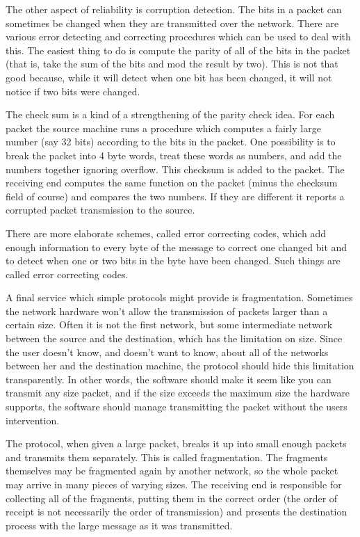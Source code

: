 The other aspect of reliability is corruption detection.  The bits in a
packet can sometimes be changed when they are transmitted over the network.
There are various error detecting and correcting procedures which can be used
to deal with this.  The easiest thing to do is compute the parity of all of
the bits in the packet (that is, take the sum of the bits and mod the result
by two).  This is not that good because, while it will detect when one bit
has been changed, it will not notice if two bits were changed.

The check sum is a kind of a strengthening of the parity check idea.
For each
packet the source machine runs a procedure which computes a fairly large 
number
(say 32 bits) according to the bits in the packet.  One possibility is to 
break the packet into 4 byte words, treat these words as numbers, and add
the numbers together ignoring overflow.  This checksum is added to the packet.
The receiving end computes the same function on the packet (minus the checksum
field of course) and compares the two numbers.  If they are different it 
reports a corrupted packet transmission to the source.

There are more elaborate schemes, called error correcting codes, which
add enough information to every byte of the message to correct
one changed bit and to
detect when one or two bits in the byte have been changed.
Such things are called error correcting codes.

A final service which simple protocols might provide is fragmentation.  
Sometimes the network hardware won't allow the transmission of packets 
larger than a certain size.  Often it is not the first network, but some
intermediate network between the source and the destination, which has
the  limitation on size.  Since the user doesn't know, and doesn't want
to know, about all of the networks between her and the destination
machine, the protocol should hide this limitation transparently.
In other words, the software should make it seem like you can transmit
any size packet, and if the size exceeds the maximum size the hardware
supports, the software should manage transmitting the packet without
the users intervention.

The protocol, when given a large packet, breaks it up into small enough
packets and transmits them separately.  This is called fragmentation.
The fragments 
themselves may be fragmented again by another network, so the whole
packet may arrive in many pieces of varying sizes.
The receiving end is responsible
for collecting all of the fragments, putting them in the correct order
(the order of receipt is not necessarily the order of transmission) and
presents the destination process with the large message as it was
transmitted.

